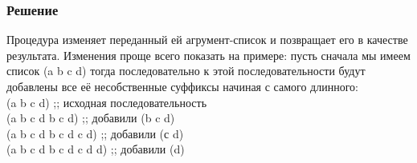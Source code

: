 \documentclass[10pt,a4paper]{article}
\begin{document}
\subsubsection*{Решение}
Процедура изменяет переданный ей агрумент-список и позвращает его в
качестве результата. Изменения проще всего показать на примере: пусть
сначала мы имеем список (a b c d) тогда последовательно к этой
последовательности будут добавлены все её несобственные  суффиксы
начиная с самого длинного: \\
(a b c d)               ;; исходная последовательность \\
(a b c d b c d)         ;; добавили (b c d) \\
(a b c d b c d c d)     ;; добавили (с d) \\
(a b c d b c d c d d)   ;; добавили (d) \\
\end{document}
